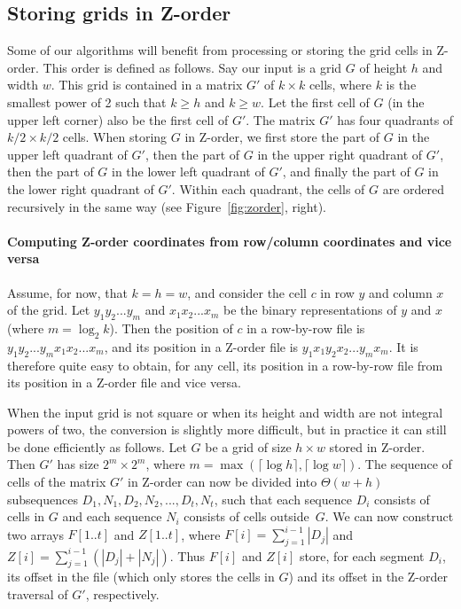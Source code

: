 \documentclass[10pt,a4paper]{article}
\begin{document}
\subsection{Storing grids in Z-order}\label{sec:Zorder}
Some of our algorithms will benefit from processing or storing the grid cells in Z-order. This order is defined as follows.
Say our input is a grid $G$ of height $h$ and width $w$. This grid is contained in a matrix $G'$ of $k \times k$ cells, where $k$ is the smallest power of 2 such that $k \geq h$ and $k \geq w$. Let the first cell of $G$ (in the upper left corner) also be the first cell of $G'$. The matrix $G'$ has four quadrants of $k/2 \times k/2$ cells. When storing $G$ in Z-order, we first store the part of $G$ in the upper left quadrant of $G'$, then the part of $G$ in the upper right quadrant of $G'$, then the part of $G$ in the lower left quadrant of $G'$, and finally the part of $G$ in the lower right quadrant of $G'$. Within each quadrant, the cells of $G$ are ordered recursively in the same way (see Figure~\ref{fig:zorder}, right).

\paragraph{Computing Z-order coordinates from row/column coordinates and vice versa}

Assume, for now, that $k = h = w$, and consider the cell $c$ in row $y$ and column $x$ of the grid. Let $y_1y_2...y_m$ and $x_1x_2...x_m$ be the binary representations of $y$ and $x$ (where $m = \log_2 k$). Then the position of $c$ in a row-by-row file is $y_1y_2...y_mx_1x_2...x_m$, and its position in a Z-order file is $y_1x_1y_2x_2...y_mx_m$. It is therefore quite easy to obtain, for any cell, its position in a row-by-row file from its position in a Z-order file and vice versa.

When the input grid is not square or when its height and width are not integral powers of two, the conversion is slightly more difficult, but in practice it can still be done efficiently as follows. Let $G$ be a grid of size $h \times w$ stored in Z-order. Then $G'$ has size $2^m \times 2^m$, where $m = \max(\lceil\log h\rceil,\lceil\log w\rceil)$. The sequence of cells of the matrix $G'$ in Z-order can now be divided into $\Theta(w+h)$ subsequences $D_1,N_1,D_2,N_2,...,D_t,N_t$, such that each sequence $D_i$ consists of cells in $G$ and each sequence $N_i$ consists of cells outside~$G$. We can now construct two arrays $F[1..t]$ and $Z[1..t]$, where $F[i] = \sum_{j=1}^{i-1} |D_j|$ and $Z[i] = \sum_{j=1}^{i-1} (|D_j| + |N_j|)$. Thus $F[i]$ and $Z[i]$ store, for each segment $D_i$, its offset in the file (which only stores the cells in $G$) and its offset in the Z-order traversal of $G'$, respectively.
\end{document}
